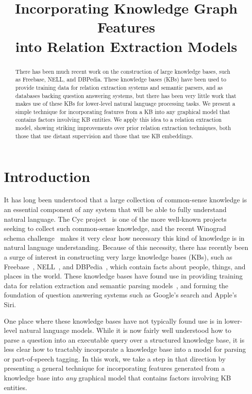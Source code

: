 \documentclass[11pt,a4paper]{article}
\title{Incorporating Knowledge Graph Features\\
into Relation Extraction Models}
\date{}
\begin{document}
\maketitle
\begin{abstract}

  There has been much recent work on the construction of large knowledge bases,
  such as Freebase, NELL, and DBPedia.  These knowledge bases (KBs) have been
  used to provide training data for relation extraction systems and semantic
  parsers, and as databases backing question answering systems, but there has
  been very little work that makes use of these KBs for lower-level natural
  language processing tasks.  We present a simple technique for incorporating
  features from a KB into any graphical model that contains factors involving
  KB entities.  We apply this idea to a relation extraction model, showing
  striking improvements over prior relation extraction techniques, both those
  that use distant supervision and those that use KB embeddings.

\end{abstract}

\section{Introduction}

It has long been understood that a large collection of common-sense knowledge
is an essential component of any system that will be able to fully understand
natural language.  The Cyc project~\cite{cyc-1995} is one of the more
well-known projects seeking to collect such common-sense knowledge, and the
recent Winograd schema challenge~\cite{winograd-schema-2012} makes it very
clear how necessary this kind of knowledge is in natural language
understanding.  Because of this necessity, there has recently been a surge of
interest in constructing very large knowledge bases (KBs), such as
Freebase~\cite{freebase-2008-bollacker}, NELL~\cite{nell-2015-aaai}, and
DBPedia~\cite{dbpedia-2012-mendes}, which contain facts about people, things,
and places in the world.  These knowledge bases have found use in providing
training data for relation extraction and semantic parsing
models~\cite{riedel-2010-distant-supervision,krishnamurthy-2012-semantic-parsing},
and forming the foundation of question answering systems such as Google's
search and Apple's Siri.

One place where these knowledge bases have not typically found use is in
lower-level natural language models.  While it is now fairly well understood
how to parse a question into an executable query over a structured knowledge
base, it is less clear how to tractably incorporate a knowledge base into a
model for parsing or part-of-speech tagging.  In this work, we take a step in
that direction by presenting a general technique for incorporating features
generated from a knowledge base into \emph{any} graphical model that contains
factors involving KB entities.
\end{document}
